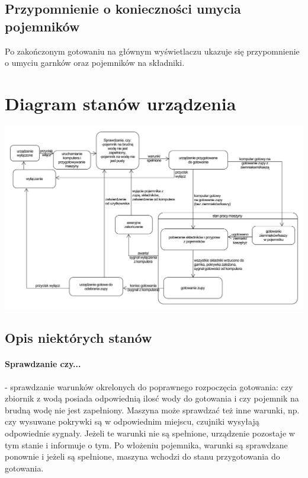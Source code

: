 \documentclass[12pt,a4paper,notitlepage]{article}
\begin{document}
\subsection{Przypomnienie o konieczności umycia pojemników}
Po zakończonym gotowaniu na głównym wyświetlaczu ukazuje się przypomnienie o umyciu garnków oraz pojemników na składniki.

\section{Diagram stanów urządzenia}

\includegraphics[scale=0.16,width=\textwidth,height=\textheight,keepaspectratio=true]{Diagram-stanow-urzadzenie.pdf}

\subsection{Opis niektórych stanów}
\paragraph{Sprawdzanie czy...} - sprawdzanie warunków okrelonych do poprawnego rozpoczęcia gotowania: czy zbiornik z wodą posiada odpowiednią ilosć wody do gotowania i czy pojemnik na brudną wodę nie jest zapełniony. Maszyna może sprawdzać też inne warunki, np. czy wysuwane pokrywki są w odpowiednim miejscu, czujniki wysyłają odpowiednie sygnały. Jeżeli te warunki nie są spełnione, urządzenie pozostaje w tym stanie i informuje o tym. Po włożeniu pojemnika, warunki są sprawdzane ponownie i jeżeli są spełnione, maszyna wchodzi do stanu przygotowania do gotowania.
\end{document}
